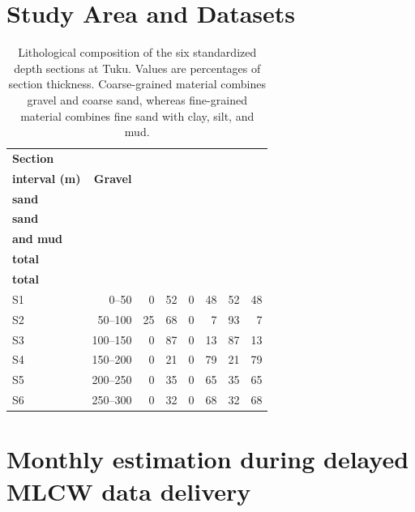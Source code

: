 \section{Study Area and Datasets}
\label{app:supp_study_data}

\begin{table}[htbp]
  \centering
  \footnotesize
  \setlength{\tabcolsep}{4pt}
  \renewcommand{\arraystretch}{1.2}
  \caption[Lithological composition by depth section at Tuku.]{Lithological composition of the six standardized depth sections at Tuku. Values are percentages of section thickness. Coarse-grained material combines gravel and coarse sand, whereas fine-grained material combines fine sand with clay, silt, and mud.}
  \label{tab:supp_tuku_lithology_by_section}
  \begin{tabular}{lrrrrrrr}
    \toprule
    \textbf{Section} & \makecell{\textbf{Depth}\\\textbf{interval (m)}} & \textbf{Gravel} & \makecell{\textbf{Coarse}\\\textbf{sand}} & \makecell{\textbf{Fine}\\\textbf{sand}} & \makecell{\textbf{Clay, silt,}\\\textbf{and mud}} & \makecell{\textbf{Coarse-grained}\\\textbf{total}} & \makecell{\textbf{Fine-grained}\\\textbf{total}} \\
    \midrule
    S1 & 0--50   & 0  & 52 & 0 & 48 & 52 & 48 \\
    S2 & 50--100 & 25 & 68 & 0 & 7  & 93 & 7  \\
    S3 & 100--150 & 0 & 87 & 0 & 13 & 87 & 13 \\
    S4 & 150--200 & 0 & 21 & 0 & 79 & 21 & 79 \\
    S5 & 200--250 & 0 & 35 & 0 & 65 & 35 & 65 \\
    S6 & 250--300 & 0 & 32 & 0 & 68 & 32 & 68 \\
    \bottomrule
  \end{tabular}
\end{table}

\FloatBarrier

\section{Monthly estimation during delayed MLCW data delivery}
\label{app:supp_delayed_delivery}

